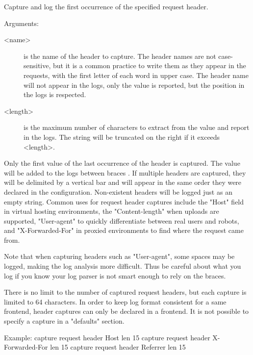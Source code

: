   Capture and log the first occurrence of the specified request header.

  
  Arguments:
  \begin{description}
  \item[<name>]    is the name of the header to capture. The header names are not
              case-sensitive, but it is a common practice to write them as they
              appear in the requests, with the first letter of each word in
              upper case. The header name will not appear in the logs, only the
              value is reported, but the position in the logs is respected.

  \item[<length>]  is the maximum number of characters to extract from the value and
              report in the logs. The string will be truncated on the right if
              it exceeds <length>.
  \end{description}

  Only the first value of the last occurrence of the header is captured. The
  value will be added to the logs between braces \chr{\{\}}. If multiple headers
  are captured, they will be delimited by a vertical bar \chr{|} and will appear
  in the same order they were declared in the configuration. Non-existent
  headers will be logged just as an empty string. Common uses for request
  header captures include the "Host" field in virtual hosting environments, the
  "Content-length" when uploads are supported, "User-agent" to quickly
  differentiate between real users and robots, and "X-Forwarded-For" in proxied
  environments to find where the request came from.

  Note that when capturing headers such as "User-agent", some spaces may be
  logged, making the log analysis more difficult. Thus be careful about what
  you log if you know your log parser is not smart enough to rely on the
  braces.

  There is no limit to the number of captured request headers, but each capture
  is limited to 64 characters. In order to keep log format consistent for a
  same frontend, header captures can only be declared in a frontend. It is not
  possible to specify a capture in a "defaults" section.

  \begin{example}{Example:}
        capture request header Host len 15
        capture request header X-Forwarded-For len 15
        capture request header Referrer len 15
  \end{example}

